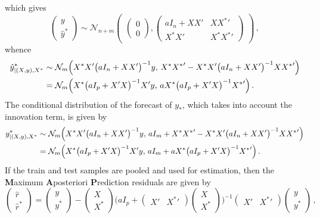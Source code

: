 \documentclass[a4paper,14pt]{article}
\newcommand{\Ncal}{\mathcal{N}}
\begin{document}
which gives
$$ \begin{pmatrix} y \\ \hat{y}^* \end{pmatrix}
  \sim \Ncal_{n+m}\begin{pmatrix}
      \begin{pmatrix} 0 \\ 0 \end{pmatrix},
      \begin{pmatrix}
        a I_n + XX' & X{X^*}' \\
        X^*X' & X^*{X^*}'
      \end{pmatrix}
    \end{pmatrix}
  \,, $$
whence
\begin{align*}
  \hat{y}^*_{|(X, y), X^*}
    & \sim \Ncal_m\Bigl(
        X^* X' \bigl(a I_n + XX' \bigr)^{-1} y, \,
        X^* {X^*}' - X^*X' \bigl(a I_n + XX' \bigr)^{-1} X {X^*}'
      \Bigr) \\
    & = \Ncal_m\Bigl(
        X^* \bigl(a I_p + X'X\bigr)^{-1} X' y, \,
        a X^* \bigl(a I_p + X'X\bigr)^{-1} {X^*}'
      \Bigr) \,.
\end{align*}
The conditional distribution of the forecast of $y_*$, which takes into account
the innovation term, is given by
\begin{align*}
  y^*_{|(X, y), X^*}
    & \sim \Ncal_m\Bigl(
        X^* X' \bigl(a I_n + XX' \bigr)^{-1} y, \,
        a I_m + X^* {X^*}' - X^*X' \bigl(a I_n + XX' \bigr)^{-1} X {X^*}'
      \Bigr) \\
    & = \Ncal_m\Bigl(
        X^* \bigl(a I_p + X'X\bigr)^{-1} X' y, \,
        a I_m + a X^* \bigl(a I_p + X'X\bigr)^{-1} {X^*}'
      \Bigr) \,.
\end{align*}
If the train and test samples are pooled and used for estimation, then the \textbf{M}aximum
\textbf{A}posteriori \textbf{P}rediction residuals are given by
$$ \begin{pmatrix} \hat{r} \\ \hat{r}^* \end{pmatrix}
  = \begin{pmatrix} y \\ y^* \end{pmatrix}
  - \begin{pmatrix} X \\ X^* \end{pmatrix} \Biggl(
      a I_p + \begin{pmatrix} X' & {X^*}' \end{pmatrix} \begin{pmatrix} X \\ X^* \end{pmatrix}
    \Biggr)^{-1} \begin{pmatrix} X' & {X^*}' \end{pmatrix}
  \begin{pmatrix} y \\ y^* \end{pmatrix}
  \,, $$
\end{document}
